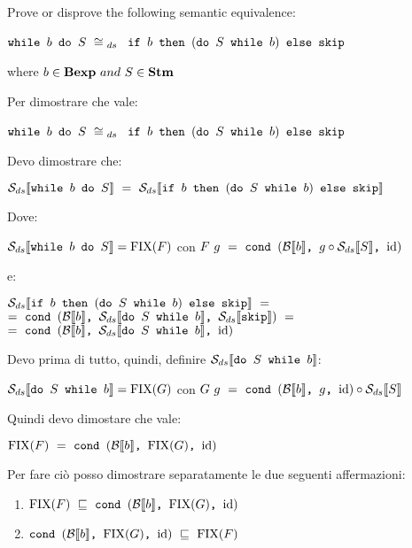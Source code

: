 \newcommand{\dSwb}[2]
{
    \mbox{\normalfont{\texttt{do }}}
    #1
    \textrm{\normalfont{\texttt{ while }}}
    #2
}
\newcommand{\exTen}
{
	$ \wbS{b}{S} ~\cong{}_{ds}~$
	{$\ifABC{b}{(\dSwb{S}{b})}{\skipistr}$}
}
\newcommand{\Sds}{\dsCtxt{S}}
\newcommand{\mineq}{\sqsubseteq}

{
	Prove or disprove the following semantic equivalence:
	\begin{center}
		\exTen{}
	\end{center}
	where $b\in\mbox{\textbf{Bexp}}~and~S\in\mbox{\textbf{Stm}}$
}
{
    Per dimostrare che vale:
    \begin{center}
    \exTen{}
    \end{center}
    Devo dimostrare che:
    \begin{center}
    $\dsCtxt{\wbS{b}{S}}~=~
    \dsCtxt{\ifABC{b}{(\dSwb{S}{b})}{\skipistr}}$
    \end{center}
    Dove:
    \begin{center}
    $\mathcal{S}_{ds}\llbracket \mbox{\normalfont{\texttt{while }}} b \textrm{\normalfont{\texttt{ do }}} S \rrbracket=\textrm{\normalfont{FIX}}(F)$ con 
    $F~g~=~\cond{b}{g \circ{} \Sds{}}{\idDS}$ \\
    \end{center}
    e:
    \begin{center}
    $\dsCtxt{\ifABC{b}{(\dSwb{S}{b})}{\skipistr}}~=$\\$=~
    \cond{b}{\dsCtxt{\dSwb{S}{b}}}{\dsCtxt{\skipistr}}~=$\\$=~
    \cond{b}{\dsCtxt{\dSwb{S}{b}}}{\idDS}$
    \end{center}
    Devo prima di tutto, quindi, definire $\dsCtxt{\dSwb{S}{b}}$:
    \begin{center}
    $\dsCtxt{\dSwb{S}{b}}=\fixp{G}$ con 
    $G~g~=~\cond{b}{g}{\idDS} \circ \Sds$
    \end{center}
    Quindi devo dimostare che vale:
    \begin{center}
    $\textrm{\normalfont{FIX}}(F)~=~\mbox{\normalfont{\texttt{cond }}} (\mathcal{B}{}\llbracket b \rrbracket \textrm{\normalfont{\texttt{, }}} \textrm{\normalfont{FIX}}(G) \textrm{\normalfont{\texttt{, }}} \textrm{\normalfont{id}})$
    \end{center}
    Per fare ciò posso dimostrare separatamente le due seguenti affermazioni:
    \begin{enumerate}
    \item $\fixp{F}~\mineq~\cond{b}{\fixp{G}}{\idDS}$
    \item $\cond{b}{\fixp{G}}{\idDS}~\mineq~\fixp{F}$
    \end{enumerate}

}
